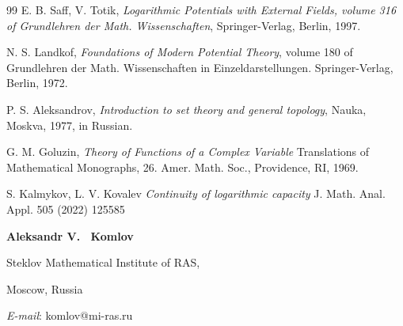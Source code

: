 \documentclass[12pt]{article}
\begin{document}
\begin{thebibliography}{99}
 E. B. Saff, V. Totik, \textit{Logarithmic Potentials with External Fields, volume 316 of
Grundlehren der Math. Wissenschaften}, Springer-Verlag, Berlin, 1997.

 N. S. Landkof, \textit{Foundations of Modern Potential Theory}, volume 180 of Grundlehren der
Math. Wissenschaften in Einzeldarstellungen. Springer-Verlag, Berlin, 1972.

 P. S. Aleksandrov, \textit{Introduction to set theory and general topology}, Nauka, Moskva, 1977, in Russian.

 G. M. Goluzin, \textit{Theory of Functions of a Complex Variable} Translations of
Mathematical Monographs, 26. Amer. Math. Soc., Providence, RI, 1969. 

 S. Kalmykov, L. V. Kovalev \textit{Continuity of logarithmic capacity} J. Math. Anal. Appl. 505 (2022) 125585


\end{thebibliography}

{\bf Aleksandr V. ~Komlov}

Steklov Mathematical Institute of RAS, 

Moscow, Russia

{\it E-mail}: komlov@mi-ras.ru
\end{document}
